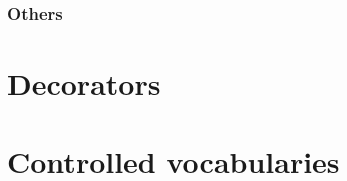 \subsubsection{Others}




\section{Decorators}



\section{Controlled vocabularies}\label{sec:CVs}




